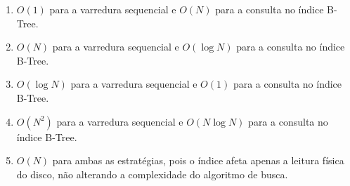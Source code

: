 \documentclass[12pt,a4paper]{article}
\begin{document}
\begin{enumerate}
    \begin{enumerate}[label=\alph*)]
        \item $O(1)$ para a varredura sequencial e $O(N)$ para a consulta no índice B-Tree.
        \item $O(N)$ para a varredura sequencial e $O(\log N)$ para a consulta no índice B-Tree.
        \item $O(\log N)$ para a varredura sequencial e $O(1)$ para a consulta no índice B-Tree.
        \item $O(N^2)$ para a varredura sequencial e $O(N \log N)$ para a consulta no índice B-Tree.
        \item $O(N)$ para ambas as estratégias, pois o índice afeta apenas a leitura física do disco, não alterando a complexidade do algoritmo de busca.
    \end{enumerate}

\end{enumerate}
\end{document}
